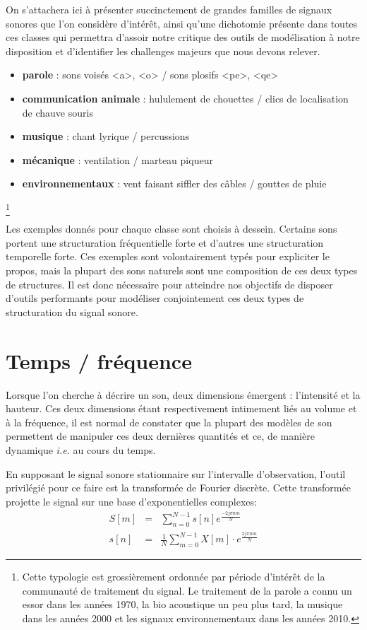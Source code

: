 On s'attachera ici à présenter succinctement de grandes familles de signaux sonores que l'on considère d'intérêt, ainsi qu'une dichotomie présente dans toutes ces classes qui permettra d'assoir notre critique des outils de modélisation à notre disposition et d'identifier les challenges majeurs que nous devons relever.

\begin{itemize}
  \item \textbf{parole} : sons voisés <a>, <o> / sons plosifs <pe>, <qe>
  \item \textbf{communication animale} : hululement de chouettes / clics de localisation de chauve souris
  \item \textbf{musique} : chant lyrique / percussions
  \item \textbf{mécanique} : ventilation / marteau piqueur
  \item \textbf{environnementaux} : vent faisant siffler des câbles / gouttes de pluie
\end{itemize}\footnote{Cette typologie est grossièrement ordonnée par période d'intérêt de la communauté de traitement du signal. Le traitement de la parole a connu un essor dans les années 1970, la bio acoustique un peu plus tard, la musique dans les années 2000 et les signaux environnementaux dans les années 2010.}

Les exemples donnés pour chaque classe sont choisis à dessein. Certains sons portent une structuration fréquentielle forte et d'autres une structuration temporelle forte. Ces exemples sont volontairement typés pour expliciter le propos, mais la plupart des sons naturels sont une composition de ces deux types de structures. Il est donc nécessaire pour atteindre nos objectifs de disposer d'outils performants pour modéliser conjointement ces deux types de structuration du signal sonore.

\section{ \nmu Temps / fréquence} \label{sec:tf}

Lorsque l'on cherche à décrire un son, deux dimensions émergent : l'intensité et la hauteur. Ces deux dimensions étant respectivement intimement liés au volume et à la fréquence, il est normal de constater que la plupart des modèles de son permettent de manipuler ces deux dernières quantités et ce, de manière dynamique \textit{i.e.} au cours du temps.

En supposant le signal sonore stationnaire sur l'intervalle d'observation, l'outil privilégié pour ce faire est la transformée de Fourier discrète. Cette transformée projette le signal sur une base d'exponentielles complexes:
\begin{eqnarray}
  S[m] &=& \sum_{n=0}^{N-1} s[n] e^{\frac{-2j \pi nm}{N}} \\
  s[n] &=& \frac{1}{N} \sum_{m=0}^{N-1} X[m] \cdot e^{\frac{ 2 j \pi m n }{N}}
\end{eqnarray}

